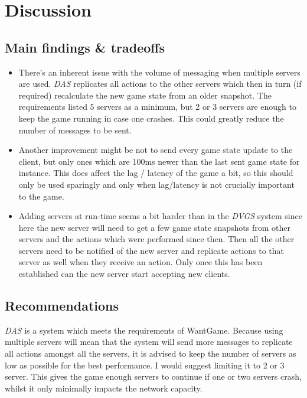 \documentclass{article}
\begin{document}
\section{Discussion}
\label{sec:discussion}

\subsection{Main findings \& tradeoffs}

\begin{itemize}
\item There's an inherent issue with the volume of messaging when multiple servers are used. \textit{DAS} replicates all actions to the other servers which then in turn (if required) recalculate the new game state from an older snapshot. The requirements listed 5 servers as a minimum, but 2 or 3 servers are enough to keep the game running in case one crashes. This could greatly reduce the number of messages to be sent. 
\item Another improvement might be not to send every game state update to the client, but only ones which are 100ms newer than the last sent game state for instance. This does affect the lag / latency of the game a bit, so this should only be used sparingly and only when lag/latency is not crucially important to the game.
\item Adding servers at run-time seems a bit harder than in the \textit{DVGS} system since here the new server will need to get a few game state snapshots from other servers and the actions which were performed since then. Then all the other servers need to be notified of the new server and replicate actions to that server as well when they receive an action. Only once this has been established can the new server start accepting new clients.
\end{itemize}

\subsection{Recommendations}

\textit{DAS} is a system which meets the requirements of WantGame. Because using multiple servers will mean that the system will send more messages to replicate all actions amongst all the servers, it is advised to keep the number of servers as low as possible for the best performance. I would suggest limiting it to 2 or 3 server. This gives the game enough servers to continue if one or two servers crash, whilst it only minimally impacts the network capacity.
\end{document}

